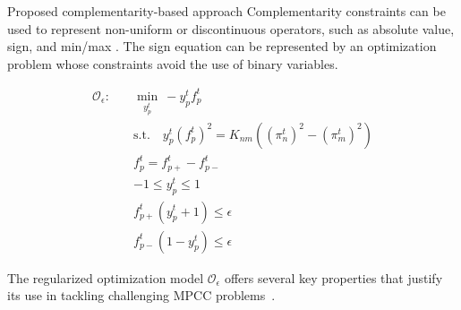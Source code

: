 \documentclass[hyperref={colorlinks,citecolor=blue,linkcolor=blue,urlcolor=blue}]{beamer}
\begin{document}
\begin{frame}{Proposed complementarity-based approach}
\footnotesize
Complementarity constraints can be used to represent non-uniform or discontinuous operators, such as absolute value, sign, and min/max \cite{mpcc}. The sign equation can be represented by an optimization problem whose constraints avoid the use of binary variables.



\begin{subequations}
\begin{align}
\mathcal{O}_\epsilon: \quad &\min\limits_{y_p^t} \ -y_p^t f_p^t \label{eq:complementarity_relaxec1} \\
&\text{s.t.} \quad y_p^t (f_p^t)^2 = K_{nm} \left( (\pi_n^t)^2 - (\pi_m^t)^2 \right) \\
&f_p^t = f_{p+}^t - f_{p-}^t \\
&-1 \leq y_p^t \leq 1 \\
&f_{p+}^t (y_p^t + 1) \leq \epsilon \label{eq:Oe:complementarity1} \\
&f_{p-}^t (1 - y_p^t) \leq \epsilon \label{eq:Oe:complementarity2}
\end{align}
\end{subequations}

The regularized optimization model $\mathcal{O}_{\epsilon}$ offers several key properties that justify its use in tackling challenging MPCC problems~\cite{Ralph_Wright_2004}.
\end{frame}
\end{document}
